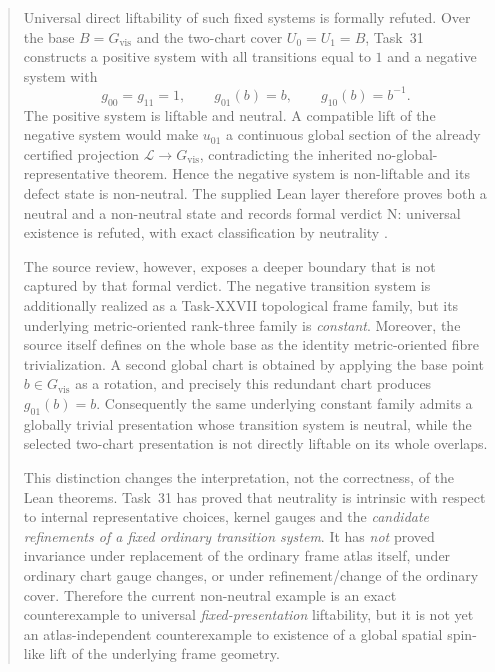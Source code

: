\documentclass[11pt,a4paper]{article}
\theoremstyle{definition}
\newcommand{\Lift}{\mathcal{L}}
\newcommand{\Gvis}{G_{\mathrm{vis}}}
\newcommand{\code}[1]{\path{#1}}
\begin{document}
\begin{abstract}
Universal direct liftability of such fixed systems is formally refuted.  Over the base $B=\Gvis$ and the two-chart cover $U_0=U_1=B$, Task~31 constructs a positive system with all transitions equal to $1$ and a negative system with
\[
 g_{00}=g_{11}=1,\qquad g_{01}(b)=b,\qquad g_{10}(b)=b^{-1}.
\]
The positive system is liftable and neutral.  A compatible lift of the negative system would make $u_{01}$ a continuous global section of the already certified projection $\Lift\to\Gvis$, contradicting the inherited no-global-representative theorem.  Hence the negative system is non-liftable and its defect state is non-neutral.  The supplied Lean layer therefore proves both a neutral and a non-neutral state and records formal verdict N: universal existence is refuted, with exact classification by neutrality \cite{AristotleTask31_2026}.

The source review, however, exposes a deeper boundary that is not captured by that formal verdict.  The negative transition system is additionally realized as a Task-XXVII topological frame family, but its underlying metric-oriented rank-three family is \emph{constant}.  Moreover, the source itself defines \code{badTriv0} on the whole base as the identity metric-oriented fibre trivialization.  A second global chart \code{badTriv1} is obtained by applying the base point $b\in\Gvis$ as a rotation, and precisely this redundant chart produces $g_{01}(b)=b$.  Consequently the same underlying constant family admits a globally trivial presentation whose transition system is neutral, while the selected two-chart presentation is not directly liftable on its whole overlaps.

This distinction changes the interpretation, not the correctness, of the Lean theorems.  Task~31 has proved that neutrality is intrinsic with respect to internal representative choices, kernel gauges and the \emph{candidate refinements of a fixed ordinary transition system}.  It has \emph{not} proved invariance under replacement of the ordinary frame atlas itself, under ordinary chart gauge changes, or under refinement/change of the ordinary cover.  Therefore the current non-neutral example is an exact counterexample to universal \emph{fixed-presentation} liftability, but it is not yet an atlas-independent counterexample to existence of a global spatial spin-like lift of the underlying frame geometry.


\end{abstract}
\end{document}
